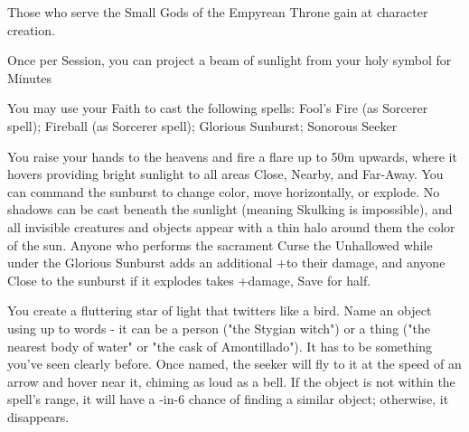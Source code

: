 {Those who serve the Small Gods of the Empyrean Throne gain \DCUP \FOC at character creation.





\GOD[
Name=Asura,
Link=small-god-asura,
GodOf=Seraph of Sunlight,
Holy=polished mirrors or brass hung from the neck or belt
]


Once per Session, you can project a beam of sunlight from your holy symbol for Minutes


You may use your Faith to cast the following spells: Fool's Fire (as Sorcerer spell); Fireball (as Sorcerer spell); Glorious Sunburst; Sonorous Seeker

\LITURGY [
  Name= Glorious Sunburst,
  Link= asura-liturgy-glorious-sunburst,
  Paradigm= Elements ,
  Save=  Y (half) ,
  Duration= Combat or \SUMDICE Minutes ,
  Counter=  n/a  ,
  Keywords= None ,
  Target=   Up to 50m straight up
]



You raise your hands to the heavens and fire a flare up to 50m upwards, where it hovers providing bright sunlight to all areas Close, Nearby, and Far-Away.  You can command the sunburst to change color, move horizontally, or explode.  No shadows can be cast beneath the sunlight (meaning Skulking is impossible), and all invisible creatures and objects appear with a thin halo around them the color of the sun.  Anyone who performs the sacrament Curse the Unhallowed while under the Glorious Sunburst adds an additional +\DICE to their damage, and anyone Close to the sunburst if it explodes takes \SUMDICE+\DICE damage, Save for half.

\LITURGY [
  Name= Sonorous Seeker,
  Link=asura-liturgy-sonorous seeker,
  Paradigm= Prophesy ,
  Save=  N ,
  Duration= \SUMDICE Minutes ,
  Counter=  n/a  ,
  Keywords= None ,
  Target=   Object up to \DICE km away
]



You create a fluttering star of light that twitters like a bird.  Name an object using up to \DICE words - it can be a person ("the Stygian witch") or a thing ("the nearest body of water" or "the cask of Amontillado").  It has to be something you've seen clearly before.  Once named, the seeker will fly to it at the speed of an arrow and hover near it, chiming as loud as a bell.  If the object is not within the spell's range, it will have a \DICE-in-6 chance of finding a similar object; otherwise, it disappears.




}
